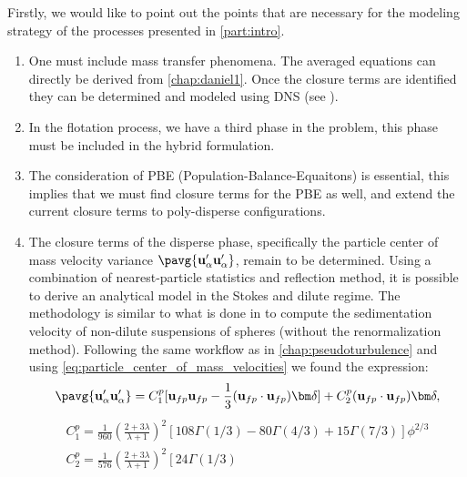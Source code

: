 Firstly,  we would like to point out the points that are necessary for the modeling strategy of the processes presented in \ref{part:intro}.
\begin{enumerate}
    \item One must include mass transfer phenomena.
    The averaged equations can directly be derived from \ref{chap:daniel1}.
    Once the closure terms are identified  they can be determined and modeled using DNS (see \citet{hidman2023assessing}). 
    \item In the flotation process, we have a third phase in the problem, this phase must be included in the hybrid formulation. 
    \item The consideration of PBE (Population-Balance-Equaitons) is essential, this implies that we must find closure terms for the PBE as well, and extend the current closure terms to poly-disperse configurations. 
    \item The closure terms of the disperse phase, specifically the particle center of mass velocity variance $\pavg{\textbf{u}_\alpha'\textbf{u}_\alpha'}$, remain to be determined. 
    Using a combination of nearest-particle statistics and reflection method, it is possible to derive an analytical model in the Stokes and dilute regime. 
    The methodology is similar to what is done in \citet{zhang2021ensemble} to compute the sedimentation velocity of non-dilute suspensions of spheres (without the renormalization method). 
    Following the same workflow as in \ref{chap:pseudoturbulence} and using \ref{eq:particle_center_of_mass_velocities} we found the expression: 
    \begin{equation*}
        \pavg{\textbf{u}_\alpha'\textbf{u}_\alpha'}
        = 
        C_1^p[\textbf{u}_{fp}\textbf{u}_{fp} - \frac{1}{3}(\textbf{u}_{fp}\cdot \textbf{u}_{fp})\bm\delta] 
        + C_2^p(\textbf{u}_{fp}\cdot \textbf{u}_{fp})\bm\delta,
    \end{equation*}
    \begin{align}
      C_1^p = \frac{1}{960}\left(\frac{2+3\lambda}{\lambda+1}\right)^2 \left[
        108\Gamma(1/3)
        - 80\Gamma (4/3)
        +15\Gamma(7/3)
      \right]\phi^{2/3}\\
      C_2^p = \frac{1}{576}\left(
        \frac{2+3\lambda}{\lambda+1}\right)^2 \left[
        24\Gamma(1/3)

\end{align}
\end{enumerate}
